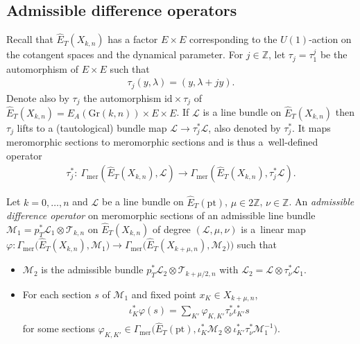 \documentclass[10pt,a4paper]{amsart}
\numberwithin{equation}{section}
\begin{document}
\subsection{Admissible difference operators}
Recall that $\hat E_T(X_{k,n})$ has a factor $E\times E$ corresponding to the $U(1)$-action on the cotangent spaces and the dynamical parameter. For $j\in\mathbb Z$, let $\tau_j=\tau_1^j$ be the automorphism of $E\times E$ such that
\begin{gather*} \tau_j(y,\lambda)=(y,\lambda+jy).
\end{gather*} Denote also by $\tau_j$ the automorphism $\mathrm{id}\times \tau_j$ of $\hat E_T(X_{k,n})=E_A(\mathrm{Gr}(k,n))\times E\times E$. If $\mathcal L$ is a line bundle on $\hat E_T(X_{k,n})$ then $\tau_j$ lifts to a (tautological) bundle map $\mathcal L\to \tau_j^*\mathcal L$, also denoted by $\tau_j^*$. It maps meromorphic sections to meromorphic sections and is thus a~well-defined operator
\begin{gather*}
 \tau^*_j\colon \ \Gamma_{\mathrm{mer}}(\hat E_T(X_{k,n}),\mathcal L)\to\Gamma_{\mathrm{mer}}(\hat E_T(X_{k,n}),\tau^*_j\mathcal L).
\end{gather*}
\begin{Definition}\label{def-adm1} Let $k=0,\dots,n$ and $\mathcal L$ be a line bundle on $\hat E_T(\mathrm{pt})$, $\mu\in 2\mathbb Z$, $\nu\in\mathbb Z$. An {\em admissible difference operator} on meromorphic sections of an
admissible line bundle $\mathcal M_1=p_T^*\mathcal L_1\otimes \mathcal T_{k,n}$ on $\hat E_T(X_{k,n})$ of degree $(\mathcal L,\mu,\nu)$ is a~linear map $\varphi\colon\Gamma_{\mathrm{mer}}\big(\hat E_T(X_{k,n}), \mathcal M_1\big)\to \Gamma_{\mathrm{mer}}\big(\hat E_T(X_{k+\mu,n}),\mathcal M_2)\big)$ such that
 \begin{itemize}\itemsep=0pt
 \item[(i)] $\mathcal M_2$ is the admissible bundle $p_T^*\mathcal L_2\otimes \mathcal T_{k+\mu/2,n}$ with $\mathcal L_2=\mathcal L\otimes \tau_\nu^*\mathcal L_1$.
 \item[(ii)] For each section $s$ of $\mathcal M_1$ and fixed point
 $x_K\in X_{k+\mu,n}$,
 \begin{gather}\label{e-do}
 \iota_K^*\varphi(s)=\sum_{K'}\varphi_{K,K'}\tau_{\nu}^*\iota_{K'}^*s
 \end{gather}
 for some sections $\varphi_{K,K'}\in\Gamma_{\mathrm{mer}}\big(\hat E_T(\mathrm{pt}),\iota^*_K\mathcal M_2\otimes\iota^*_{K'}\tau^*_\nu \mathcal M_1^{-1}\big)$.
 \end{itemize}
\end{Definition}
\end{document}

